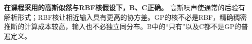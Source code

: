 \textbf{在课程采用的高斯似然与RBF核假设下，B、C正确。} 高斯噪声使通常的后验有解析形式；RBF核让相近输入具有更高的协方差。GP的核不必是RBF，精确稠密推断的计算成本较高，输入也不必独立同分布。B中的“只有”以及C都不是GP的普遍定义。
